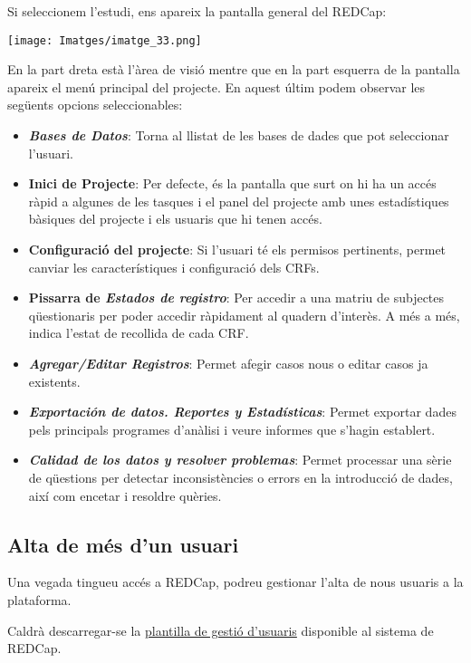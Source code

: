 \documentclass[
]{article}
\providecommand{\tightlist}{%
  \setlength{\itemsep}{0pt}\setlength{\parskip}{0pt}}
\begin{document}
Si seleccionem l'estudi, ens apareix la pantalla general del REDCap:

\texttt{[image: Imatges/imatge\_33.png]}

En la part dreta està l'àrea de visió mentre que en la part esquerra de la pantalla apareix el menú principal del projecte. En aquest últim podem observar les següents opcions seleccionables:

\begin{itemize}
\tightlist
\item
  \textbf{\emph{Bases de Datos}}: Torna al llistat de les bases de dades que pot seleccionar l'usuari.
\item
  \textbf{Inici de Projecte}: Per defecte, és la pantalla que surt on hi ha un accés ràpid a algunes de les tasques i el panel del projecte amb unes estadístiques bàsiques del projecte i els usuaris que hi tenen accés.
\item
  \textbf{Configuració del projecte}: Si l'usuari té els permisos pertinents, permet canviar les característiques i configuració dels CRFs.
\item
  \textbf{Pissarra de \emph{Estados de registro}}: Per accedir a una matriu de subjectes qüestionaris per poder accedir ràpidament al quadern d'interès. A més a més, indica l'estat de recollida de cada CRF.
\item
  \textbf{\emph{Agregar/Editar Registros}}: Permet afegir casos nous o editar casos ja existents.
\item
  \textbf{\emph{Exportación de datos. Reportes y Estadísticas}}: Permet exportar dades pels principals programes d'anàlisi i veure informes que s'hagin establert.
\item
  \textbf{\emph{Calidad de los datos y resolver problemas}}: Permet processar una sèrie de qüestions per detectar inconsistències o errors en la introducció de dades, així com encetar i resoldre quèries.
\end{itemize}

\hypertarget{alta-de-muxe9s-dun-usuari}{%
\subsection{\texorpdfstring{\textbf{Alta de més d'un usuari}}{Alta de més d'un usuari}}\label{alta-de-muxe9s-dun-usuari}}

Una vegada tingueu accés a REDCap, podreu gestionar l'alta de nous usuaris a la plataforma.

Caldrà descarregar-se la \href{Dades/UserImportTemplate.csv}{plantilla de gestió d'usuaris} disponible al sistema de REDCap.
\end{document}
